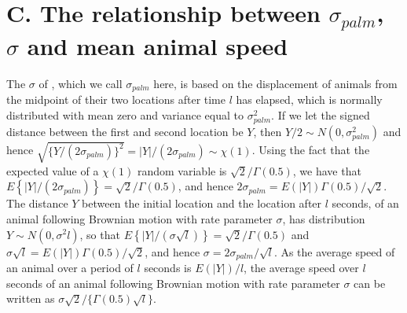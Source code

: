 \documentclass[useAMS, usenatbib, referee]{biom}\usepackage[]{graphicx}\usepackage[]{color}
\begin{document}
\vspace{-1em}

\section{C. The relationship between $\sigma_{palm}$, $\sigma$ and mean animal speed}
\label{appx:sigmaspd}

The $\sigma$ of \cite{Stevenson+al:19}, which we call $\sigma_{palm}$ here, is based on the displacement of animals from the midpoint of their two locations after time $l$ has elapsed, which is normally distributed with mean zero and variance equal to $\sigma_{palm}^2$. If we let the signed distance between the first and second location be $Y$, then $Y/2\sim N(0,\sigma_{palm}^2)$ and hence $\sqrt{\{Y/(2\sigma_{palm})\}^2}=|Y|/(2\sigma_{palm})\sim\chi(1)$. Using the fact that the expected value of a $\chi(1)$ random variable is $\sqrt{2}/\Gamma(0.5)$, we have that $E\left\{|Y|/(2\sigma_{palm})\right\}=\sqrt{2}/\Gamma(0.5)$, and hence $2\sigma_{palm}=E(|Y|)\Gamma(0.5)/\sqrt{2}$. The distance $Y$ between the initial location and the location after $l$ seconds, of an animal following Brownian motion with rate parameter $\sigma$, has distribution $Y\sim N(0,\sigma^2l)$, so that $E\left\{|Y|/(\sigma\sqrt{l})\right\}=\sqrt{2}/\Gamma(0.5)$ and $\sigma\sqrt{l}=E(|Y|)\Gamma(0.5)/\sqrt{2}$, and hence $\sigma=2\sigma_{palm}/\sqrt{l}$. As the average speed of an animal over a period of $l$ seconds is $E(|Y|)/l$, the average speed over $l$ seconds of an animal following Brownian motion with rate parameter $\sigma$ can be written as $\sigma\sqrt{2}/\{\Gamma(0.5)\sqrt{l}\}$.



\end{document}
